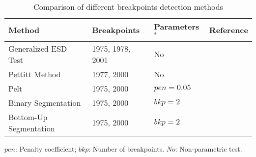 \begin{table}[h!]
    \centering
    \begin{tabularx}{\textwidth}{llll}
        \toprule
        \textbf{Method} & \textbf{Breakpoints} & \textbf{Parameters$^*$} & \textbf{Reference} \\
        \midrule
        Generalized ESD Test & 1975, 1978, 2001 & No & \cite{matteson2014} \\
        Pettitt Method & 1977, 2000 & No & \cite{pettitt1979} \\
        Pelt & 1975, 2000 & $pen=0.05$ & \cite{killick2012} \\
        Binary Segmentation & 1975, 2000 & $bkp=2$ & \cite{bai1997} \\
        Bottom-Up Segmentation & 1975, 2000 & $bkp=2$ & \cite{keogh2001} \\
        \bottomrule
    \end{tabularx}
    \footnotesize{$pen$: Penalty coefficient; $bkp$: Number of breakpoints. $No$: Non-parametric test.}
    \caption{Comparison of different breakpoints detection methods}\label{table:breakpoint-detection-methods}
\end{table}
